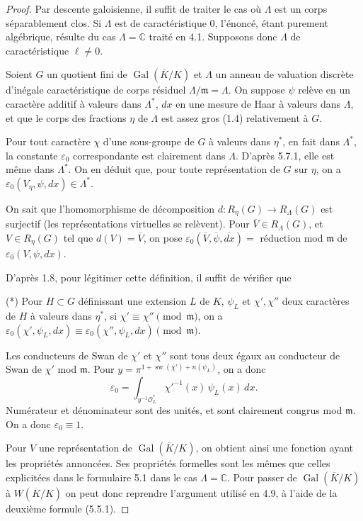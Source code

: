 \documentclass[11pt]{amsart}
\theoremstyle{plain}
\theoremstyle{definition}
\DeclareMathOperator{\Gal}{Gal}
\DeclareMathOperator{\sw}{sw}
\begin{document}
\begin{proof}
Par descente galoisienne, il suffit de traiter le cas o\`u $\Lambda$ est un corps s\'eparablement clos. Si $\Lambda$ est de caract\'eristique 0, l'\'enonc\'e, \'etant purement alg\'ebrique, r\'esulte du cas $\Lambda = \mathbb{C}$ trait\'e en 4.1. Supposons donc $\Lambda$ de caract\'eristique $\ell \not= 0$.

Soient $G$ un quotient fini de $\Gal(\overline{K}/K)$ et $\Lambda$ un anneau de valuation discr\`ete d'in\'egale caract\'eristique de corps r\'esiduel $\Lambda/\mathfrak{m} = \Lambda$. On suppose $\psi$ rel\`eve en un caract\`ere additif \`a valeurs dans $\Lambda^*$, $dx$ en une mesure de Haar \`a valeurs dans $\Lambda$, et que le corps des fractions $\eta$ de $\Lambda$ est assez gros (1.4) relativement \`a $G$.

Pour tout caract\`ere $\chi$ d'une sous-groupe de $G$ \`a valeurs dans $\eta^*$, en fait dans $\Lambda^*$, la constante $\varepsilon_0$ correspondante est clairement dans $\Lambda$. D'apr\`es 5.7.1, elle est m\^eme dans $\Lambda^*$. On en d\'eduit que, pour toute repr\'esentation de $G$ sur $\eta$, on a $\varepsilon_0(V_\eta,\psi,dx) \in \Lambda^*$.

On sait que l'homomorphisme de d\'ecomposition $d: R_\eta(G) \to R_\Lambda(G)$ est surjectif (les repr\'esentations virtuelles se rel\`event). Pour $\overline{V} \in R_\Lambda(G)$, et $V \in R_\eta(G)$ tel que $d(V) = \overline{V}$, on pose $\varepsilon_0(\overline{V},\overline{\psi},\overline{dx}) =$ r\'eduction mod $\mathfrak{m}$ de $\varepsilon_0(V,\psi,dx)$.

D'apr\`es 1.8, pour l\'egitimer cette d\'efinition, il suffit de v\'erifier que
\begin{flushleft}
(*) Pour $H \subset G$ d\'efinissant une extension $L$ de $K$, $\psi_L$ et $\chi', \chi''$ deux caract\`eres de $H$ \`a valeurs dans $\eta^*$, si $\chi' \equiv \chi'' \pmod{\mathfrak{m}}$, on a $\varepsilon_0(\chi',\psi_L,dx) \equiv \varepsilon_0(\chi'',\psi_L,dx) \pmod{\mathfrak{m}}$.
\end{flushleft}

Les conducteurs de Swan de $\chi'$ et $\chi''$ sont tous deux \'egaux au conducteur de Swan de $\chi'$ mod $\mathfrak{m}$. Pour $y = \pi^{1+\sw(\chi')+n(\psi_L)}$, on a donc
\[
\varepsilon_0 = \int_{y^{-1}\mathcal{O}_L^*} \chi'^{-1}(x) \, \psi_L(x) \, dx.
\]
Num\'erateur et d\'enominateur sont des unit\'es, et sont clairement congrus mod $\mathfrak{m}$. On a donc $\varepsilon_0 \equiv 1$.

Pour $V$ une repr\'esentation de $\Gal(\overline{K}/K)$, on obtient ainsi une fonction ayant les propri\'et\'es annonc\'ees. Ses propri\'et\'es formelles sont les m\^emes que celles explicit\'ees dans le formulaire 5.1 dans le cas $\Lambda = \mathbb{C}$. Pour passer de $\Gal(\overline{K}/K)$ \`a $W(\overline{K}/K)$ on peut donc reprendre l'argument utilis\'e en 4.9, \`a l'aide de la deuxi\`eme formule (5.5.1).
\end{proof}
\end{document}
